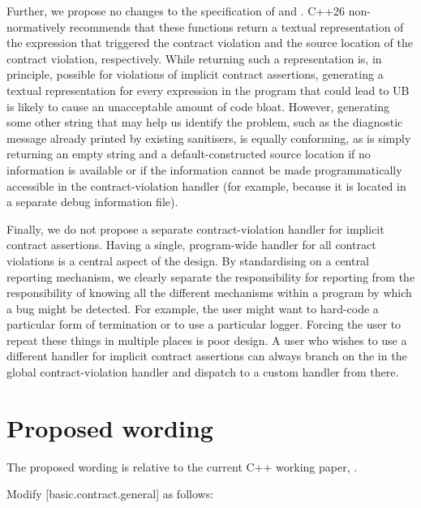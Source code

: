 Further, we propose no changes to the specification of  and . C++26 non-normatively recommends that these functions return a textual representation of the expression that triggered the contract violation and the source location of the contract violation, respectively. While returning such a representation is, in principle, possible for violations of implicit contract assertions, generating a textual representation for every expression in the program that could lead to UB is likely to cause an unacceptable amount of code bloat. However, generating some other string that may help us identify the problem, such as the diagnostic message already printed by existing sanitisers, is equally conforming, as is simply returning an empty string and a default-constructed source location if no information is available or if the information cannot be made programmatically accessible in the contract-violation handler (for example,
because it is located in a separate debug information file). 

Finally, we do not propose a separate contract-violation handler for implicit contract assertions. Having a single, program-wide handler for all contract violations is a central aspect of the \cite{P2900R14} design. By standardising on a central reporting mechanism, we clearly separate the responsibility for reporting from the responsibility of knowing all the different mechanisms within a program by which a bug might be detected. For example, the user might want to hard-code a particular form of termination or to use a particular logger. Forcing the user to repeat these things in multiple places is poor design. A user who wishes to use a different handler for implicit contract assertions can always branch on the  in the global contract-violation handler and dispatch to a custom handler from there.


\section{Proposed wording}
\label{wording}

The proposed wording is relative to the current C++ working paper, \cite{N5008}.

Modify [basic.contract.general] as follows:

